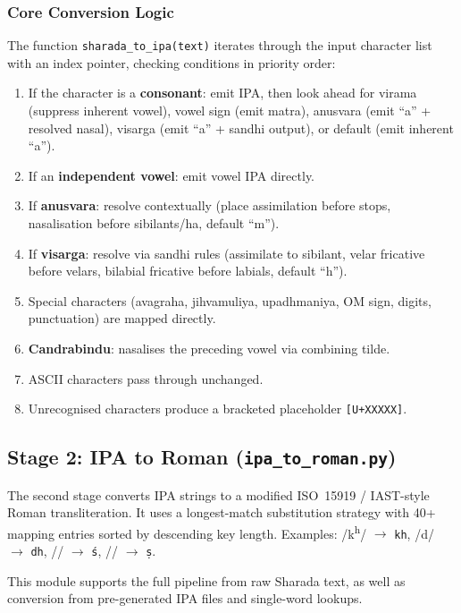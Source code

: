\documentclass[11pt]{article}
\begin{document}
\subsubsection{Core Conversion Logic}
The function \texttt{sharada\_to\_ipa(text)} iterates through the input character list with an index pointer, checking conditions in priority order:

\begin{enumerate}
    \item If the character is a \textbf{consonant}: emit IPA, then look ahead for virama (suppress inherent vowel), vowel sign (emit matra), anusvara (emit ``a'' + resolved nasal), visarga (emit ``a'' + sandhi output), or default (emit inherent ``a'').
    \item If an \textbf{independent vowel}: emit vowel IPA directly.
    \item If \textbf{anusvara}: resolve contextually (place assimilation before stops, nasalisation before sibilants/ha, default ``m'').
    \item If \textbf{visarga}: resolve via sandhi rules (assimilate to sibilant, velar fricative before velars, bilabial fricative before labials, default ``h'').
    \item Special characters (avagraha, jihvamuliya, upadhmaniya, OM sign, digits, punctuation) are mapped directly.
    \item \textbf{Candrabindu}: nasalises the preceding vowel via combining tilde.
    \item ASCII characters pass through unchanged.
    \item Unrecognised characters produce a bracketed placeholder \texttt{[U+XXXXX]}.
\end{enumerate}

\subsection{Stage 2: IPA to Roman (\texttt{ipa\_to\_roman.py})}
The second stage converts IPA strings to a modified ISO~15919 / IAST-style Roman transliteration. It uses a longest-match substitution strategy with 40+ mapping entries sorted by descending key length. Examples: /k\textsuperscript{h}/ $\rightarrow$ \texttt{kh}, /d\textsubbridge{}\textsuperscript{}/ $\rightarrow$ \texttt{dh}, // $\rightarrow$ \texttt{\'{s}}, // $\rightarrow$ \texttt{\d{s}}.

This module supports the full pipeline from raw Sharada text, as well as conversion from pre-generated IPA files and single-word lookups.
\end{document}
